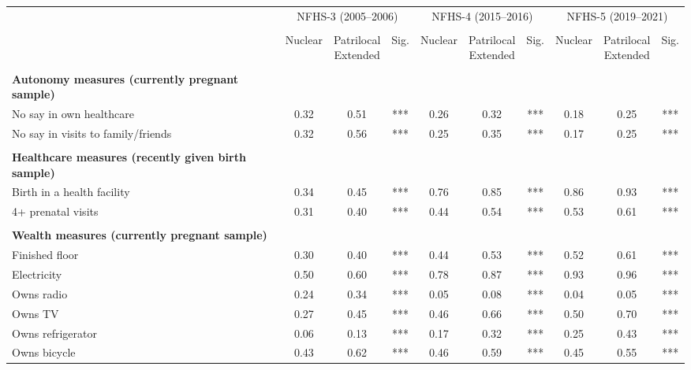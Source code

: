 \begin{tabular}{lccccccccc}
\toprule
 & \multicolumn{3}{c}{NFHS-3 (2005--2006)} & \multicolumn{3}{c}{NFHS-4 (2015--2016)} & \multicolumn{3}{c}{NFHS-5 (2019--2021)} \\\\
\cmidrule(lr){2-4} \cmidrule(lr){5-7} \cmidrule(lr){8-10}
 & Nuclear & \shortstack{Patrilocal\\Extended} & Sig. & Nuclear & \shortstack{Patrilocal\\Extended} & Sig. & Nuclear & \shortstack{Patrilocal\\Extended} & Sig. \\\\
\midrule
\textbf{Autonomy measures (currently pregnant sample)}&&&&&&&&&\\
\hspace*{2em}No say in own healthcare&0.32&0.51&***&0.26&0.32&***&0.18&0.25&***\\
\hspace*{2em}No say in visits to family/friends&0.32&0.56&***&0.25&0.35&***&0.17&0.25&***\\
&&&&&&&&&\\
\textbf{Healthcare measures (recently given birth sample)}&&&&&&&&&\\
\hspace*{2em}Birth in a health facility&0.34&0.45&***&0.76&0.85&***&0.86&0.93&***\\
\hspace*{2em}4+ prenatal visits&0.31&0.40&***&0.44&0.54&***&0.53&0.61&***\\
&&&&&&&&&\\
\textbf{Wealth measures (currently pregnant sample)}&&&&&&&&&\\
\hspace*{2em}Finished floor&0.30&0.40&***&0.44&0.53&***&0.52&0.61&***\\
\hspace*{2em}Electricity&0.50&0.60&***&0.78&0.87&***&0.93&0.96&***\\
\hspace*{2em}Owns radio&0.24&0.34&***&0.05&0.08&***&0.04&0.05&***\\
\hspace*{2em}Owns TV&0.27&0.45&***&0.46&0.66&***&0.50&0.70&***\\
\hspace*{2em}Owns refrigerator&0.06&0.13&***&0.17&0.32&***&0.25&0.43&***\\
\hspace*{2em}Owns bicycle&0.43&0.62&***&0.46&0.59&***&0.45&0.55&***\\

\end{tabular}
